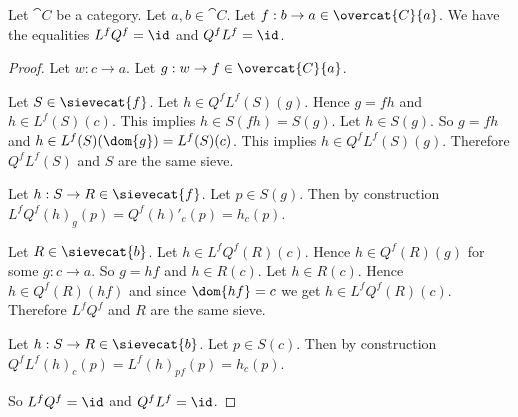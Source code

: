 \begin{lemma}
Let $\cat{C}$ be a category.
Let $a,b \in \cat{C}$.
Let $f:b \rightarrow a \in \overcat{C}{a}$.
We have the equalities $L^fQ^f = \id$ and $Q^fL^f = \id$.
\end{lemma}
\begin{proof}
Let $w: c \rightarrow a$.
Let $g:w \rightarrow f \in \overcat{C}{a}$.

Let $S\in \sievecat{f}$.
Let $h\in Q^fL^f(S)(g)$.
Hence $g=fh$ and $h\in L^f(S)(c)$.
This implies $h\in S(fh) = S(g)$.
Let $h\in S(g)$.
So $g=fh$ and $h \in L^f(S)(\dom{g})= L^f(S)(c)$.
This implies $h\in Q^fL^f(S)(g)$.
Therefore $Q^fL^f(S)$ and $S$ are the same sieve.

Let $h:S \rightarrow R \in \sievecat{f}$.
Let $p \in S(g)$.
Then by construction $L^fQ^f(h)_g(p) = Q^f(h)'_{c}(p) = h_{c}(p)$.

Let $R\in \sievecat{b}$.
Let $h\in L^fQ^f(R)(c)$.
Hence $h\in Q^f(R)(g)$ for some $g:c\rightarrow a$.
So $g=hf$ and $h\in R(c)$.
Let $h\in R(c)$.
Hence $h\in Q^f(R)(hf)$ and since $\dom{hf} = c$ we get $h\in L^fQ^f(R)(c)$.
Therefore $L^fQ^f$ and $R$ are the same sieve.

Let $h:S \rightarrow R \in \sievecat{b}$.
Let $p \in S(c)$.
Then by construction $Q^fL^f(h)_{c}(p) = L^f(h)_{pf}(p) = h_{c}(p)$.

So $L^fQ^f = \id$ and $Q^fL^f = \id$.
\end{proof}